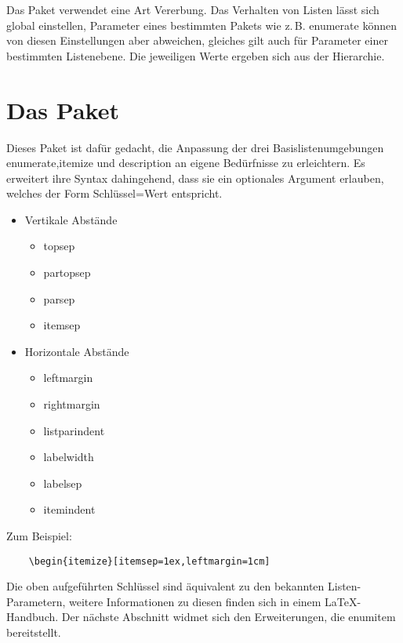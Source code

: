 \documentclass[a4paper,ngerman]{ltxguide}
\newcommand\0{\unskip\enspace\fbox{\fontsize{4}{4}\selectfont NEU 3.0}}
\newcommand\3{\unskip\enspace\fbox{\fontsize{4}{4}\selectfont NEW 3.0}}
\begin{document}
Das Paket verwendet eine Art \glqq Vererbung\grqq. Das Verhalten von Listen l\"asst sich global einstellen, 
Parameter eines bestimmten Pakets wie z.\,B. \textsf{enumerate} k\"onnen von diesen Einstellungen aber abweichen, 
gleiches gilt auch f\"ur Parameter einer bestimmten Listenebene. Die jeweiligen Werte ergeben sich aus der Hierarchie.
	
	\section{Das Paket}
	
Dieses Paket ist daf\"ur gedacht, die Anpassung der drei Basislistenumgebungen \textsf{enumerate},\textsf{itemize} 
und \textsf{description} an eigene Bed\"urfnisse zu erleichtern. Es erweitert ihre Syntax dahingehend, dass sie ein 
optionales Argument erlauben, welches der Form \textsf{Schl\"ussel=Wert} entspricht.

	\begin{itemize}
		\item{Vertikale Abst\"ande}
			\begin{itemize}
				\item{\textsf{topsep}}
				\item{\textsf{partopsep}}
				\item{\textsf{parsep}}
				\item{\textsf{itemsep}}
			\end{itemize}
		\item{Horizontale Abst\"ande}
			\begin{itemize}
				\item{\textsf{leftmargin}}
				\item{\textsf{rightmargin}}
				\item{\textsf{listparindent}}
				\item{\textsf{labelwidth}}
				\item{\textsf{labelsep}}
				\item{\textsf{itemindent}}
			\end{itemize}
	\end{itemize}
	
	Zum Beispiel:

	\begin{verbatim}
	\begin{itemize}[itemsep=1ex,leftmargin=1cm]
	\end{verbatim}	
	
Die oben aufgef\"uhrten Schl\"ussel sind \"aquivalent zu den bekannten Listen-Parametern, weitere Informationen zu 
diesen finden sich in einem \LaTeX -Handbuch. Der n\"achste Abschnitt widmet sich den Erweiterungen, die 
\textsf{enumitem} bereitstellt.
\end{document}
